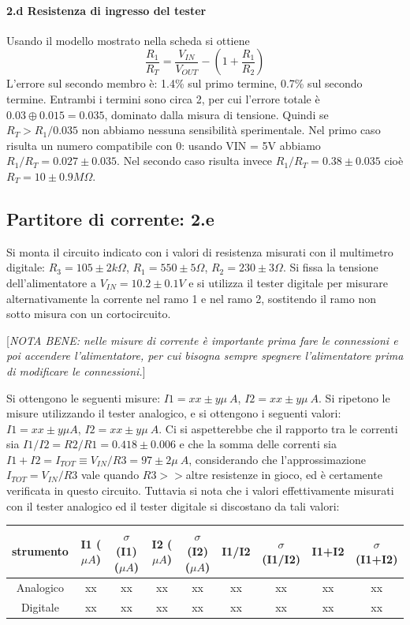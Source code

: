 \documentclass[10pt,a4paper]{article}
\newcommand{\rem}[1]{[\emph{#1}]}
\begin{document}
\paragraph{2.d Resistenza di ingresso del tester}

 Usando il modello mostrato nella scheda si ottiene
\[ \frac{R_1}{R_T} =  \frac{V_{IN}}{V_{OUT}} - (1 +  \frac{R_1}{R_2} )
\]
L'errore sul secondo membro \`e: 1.4\% sul primo termine, 0.7\% sul secondo termine. Entrambi i termini sono circa 2, per cui l'errore totale \`e $ 0.03 \oplus 0.015 = 0.035$, dominato dalla misura di tensione. Quindi se  $R_T > R_1/0.035 $ non abbiamo nessuna sensibilit\`a sperimentale. 
Nel primo caso risulta un numero compatibile con 0: usando VIN = 5V abbiamo $R_1/R_T =0.027 \pm 0.035 $.
Nel secondo caso risulta invece $R_1/R_T =0.38 \pm 0.035 $ cio\`e $ R_T = 10 \pm 0.9 M\Omega$.

\subsection{Partitore di corrente: 2.e}

Si monta il circuito indicato con i valori di resistenza misurati con il multimetro digitale: 
$R_3= 105\pm 2 k\Omega$, $R_1 = 550\pm 5 \Omega$, $R_2 = 230\pm 3 \Omega$.
Si fissa la tensione dell'alimentatore a $V_{IN}=10.2 \pm 0.1 V$ e si utilizza il tester digitale per misurare alternativamente la corrente nel ramo 1 e nel ramo 2, sostitendo il ramo non sotto misura con un cortocircuito. 

\rem{NOTA BENE: nelle misure di corrente \`e importante prima fare le connessioni e poi accendere l'alimentatore, per cui bisogna sempre spegnere l'alimentatore prima di modificare le connessioni.}

Si ottengono le seguenti misure: $I1 = xx \pm y \mu ~A $, $I2 = xx \pm y \mu ~A $. 
Si ripetono le misure utilizzando il tester analogico, e si ottengono i seguenti valori:
$I1 = xx \pm y \mu A $, $I2 = xx \pm y \mu ~A $. 
Ci si aspetterebbe che il rapporto tra le correnti sia $I1/I2 = R2/R1 = 0.418 \pm 0.006$ e che la somma delle correnti sia $I1 + I2 = I_{TOT} \equiv V_{IN}/R3 = 97 \pm 2 \mu~A$, considerando che l'approssimazione $I_{TOT}=V_{IN}/R3$ vale quando $R3>>$altre resistenze in gioco, ed \`e certamente verificata in questo circuito. 
Tuttavia si nota che i valori effettivamente misurati con il tester analogico ed il tester digitale si discostano da tali valori:

\begin{center}
\begin{tabular}{|c|c|c|c|c|c|c|c|c|}
\hline 
strumento& I1 ($\mu A$)& $\sigma$(I1) ($\mu A$) & I2	($\mu A$) & $\sigma$(I2) ($\mu A$) & I1/I2 
& $\sigma$(I1/I2) & I1+I2 & $\sigma$(I1+I2) \\
\hline 
Analogico & xx & xx  & xx & xx & xx & xx & xx & xx \\
Digitale & xx & xx  & xx & xx & xx & xx & xx & xx \\
\hline 
\end{tabular} 
\end{center}
\end{document}
